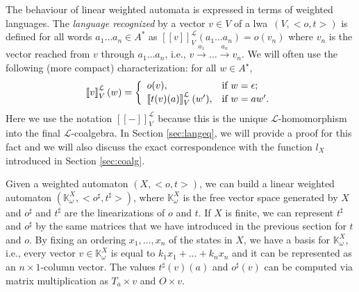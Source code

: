\documentclass[3p]{elsarticle}
\def\tr#1{\stackrel{#1}{\to}}          %
\newcommand{\fL}{\mathcal{L}}    %
\newcommand{\matrixproduct}{\times} %
\newcommand{\beh}[3]{\left[\!\left[ #1 \right]\!\right]^{#2}_{#3}} %
\newcommand{\K}{\mathbb{K}}            %
\newcommand{\lwa}{{\sc lwa}}           %
\begin{document}
The behaviour of linear weighted automata is expressed in terms of
weighted languages. The \emph{language recognized} by a vector $v\in
V$ of a \lwa\ $(V,<o,t>)$ is defined for all words $a_1 \dots a_n\in
A^*$ as $\beh{v}{\fL}{V}(a_1\dots a_n)=o(v_n)$ where $v_n$ is the
vector reached from $v$ through $a_1\dots a_n$, i.e., $v \tr{a_1}
\dots \tr{a_n}v_n$.
%
We will often use the following (more compact) characterization:
for all $ w \in A^{\star}$, $$\beh{v}{\fL}{V}(w)= \left\{%
\begin{array}{ll}
    o(v), & \hbox{if $w=\epsilon$;} \\
    \beh{t(v)(a)}{\fL}{V}(w'), & \hbox{if $w=aw'$.} \\
\end{array}%
\right.$$
%
Here we use the notation $\beh{-}{\fL}{V}$ because this is the unique
$\fL$-homomorphism into the final $\fL$-coalgebra. In Section
\ref{sec:langeq}, we will provide a proof for this  fact and we will
also discuss the exact correspondence with the function $l_X$
introduced in Section \ref{sec:coalg}.

\medskip

Given a weighted automaton $(X,<o,t>)$, we can build a linear
weighted automaton $(\K_{\omega}^X,<o^{\sharp},t^{\sharp}>)$, where
$\K_{\omega}^X$ is the free vector space generated by $X$ and
$o^{\sharp}$ and $t^{\sharp}$ are the linearizations of $o$ and $t$.
If $X$ is finite, we can represent $t^{\sharp}$ and $o^\sharp$ by
the same matrices that we have introduced in the previous section
for $t$ and $o$. By fixing an ordering $x_1, \dots, x_n$ of the
states in $X$, we have a basis for $\K_{\omega}^X$, i.e., every
vector $v\in\K_{\omega}^X$ is equal to $k_1x_1+\dots + k_nx_n$ and
it can be represented as an $n\times 1$-column vector. The values
$t^{\sharp}(v)(a)$ and $o^{\sharp}(v)$ can be computed via matrix
multiplication as $T_a \matrixproduct v$ and $O \matrixproduct v$.
\end{document}
